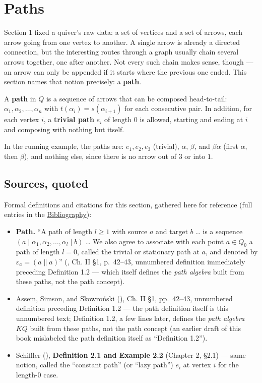 \section{Paths}\label{sec:11-path-algebras:02-paths:1}

Section 1 fixed a quiver's raw data: a set of vertices and a set of arrows, each arrow going from one vertex to another. A single arrow is already a directed connection, but the interesting routes through a graph usually chain several arrows together, one after another. Not every such chain makes sense, though --- an arrow can only be appended if it starts where the previous one ended. This section names that notion precisely: a \textbf{path}.

A \textbf{path} in \(Q\) is a sequence of arrows that can be composed head-to-tail: \(\alpha_1, \alpha_2, \dots, \alpha_n\) with \(t(\alpha_i) = s(\alpha_{i+1})\) for each consecutive pair. In addition, for each vertex \(i\), a \textbf{trivial path} \(e_i\) of length \(0\) is allowed, starting and ending at \(i\) and composing with nothing but itself.

In the running example, the paths are: \(e_1, e_2, e_3\) (trivial), \(\alpha\), \(\beta\), and \(\beta\alpha\) (first \(\alpha\), then \(\beta\)), and nothing else, since there is no arrow out of \(3\) or into \(1\).

\subsection{Sources, quoted}\label{sec:11-path-algebras:02-paths:2}

Formal definitions and citations for this section, gathered here for reference (full entries in the \hyperref[sec:root:bibliography:1]{Bibliography}):

\begin{itemize}
\tightlist
\item
  \textbf{Path.} ``A path of length \(l \geq 1\) with source \(a\) and target \(b\) \ldots{} is a sequence \((a \mid \alpha_1, \alpha_2, \ldots, \alpha_l
  \mid b)\) \ldots{} We also agree to associate with each point \(a \in
  Q_0\) a path of length \(l = 0\), called the trivial or stationary path at \(a\), and denoted by \(\varepsilon_a = (a \| a)\)'' (\cite{AssemSimsonSkowronski2006}, Ch. II §1, p.~42--43, unnumbered definition immediately preceding Definition 1.2 --- which itself defines the \emph{path algebra} built from these paths, not the path concept).
\item
  Assem, Simson, and Skowroński (\cite{AssemSimsonSkowronski2006}), Ch. II §1, pp.~42--43, unnumbered definition preceding Definition 1.2 --- the path definition itself is this unnumbered text; Definition 1.2, a few lines later, defines the \emph{path algebra} \(KQ\) built from these paths, not the path concept (an earlier draft of this book mislabeled the path definition itself as ``Definition 1.2'').
\item
  Schiffler (\cite{Schiffler2014}), \textbf{Definition 2.1 and Example 2.2} (Chapter 2, §2.1) --- same notion, called the ``constant path'' (or ``lazy path'') \(e_i\) at vertex \(i\) for the length-\(0\) case.
\end{itemize}
